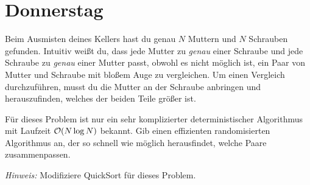 \documentclass{uebung_cs}
\begin{document}
\newpage
\section*{Donnerstag}

\begin{aufgabe}
	Beim Ausmisten deines Kellers hast du genau $N$ Muttern und $N$ Schrauben gefunden.
	Intuitiv weißt du, dass jede Mutter zu \emph{genau} einer Schraube und jede Schraube zu \emph{genau} einer Mutter passt, obwohl es nicht möglich ist, ein Paar von Mutter und Schraube mit bloßem Auge zu vergleichen. 
	Um einen Vergleich durchzuführen, musst du die Mutter an der Schraube anbringen und herauszufinden, welches der beiden Teile größer ist. 

	Für dieses Problem ist nur ein sehr komplizierter deterministischer Algorithmus mit Laufzeit $\mathcal{O}(N \log N)$ bekannt. 
	Gib einen effizienten randomisierten Algorithmus an, der so schnell wie möglich herausfindet, welche Paare zusammenpassen. 
	
	\textit{Hinweis:} Modifiziere QuickSort für dieses Problem.
\end{aufgabe}
\end{document}
